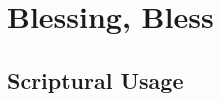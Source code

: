 \section{Blessing, Bless}
	\label{BLESSING}
	





\subsection{Scriptural Usage} %
	\label{BLESSING-SCRIPTURES}

	
	
